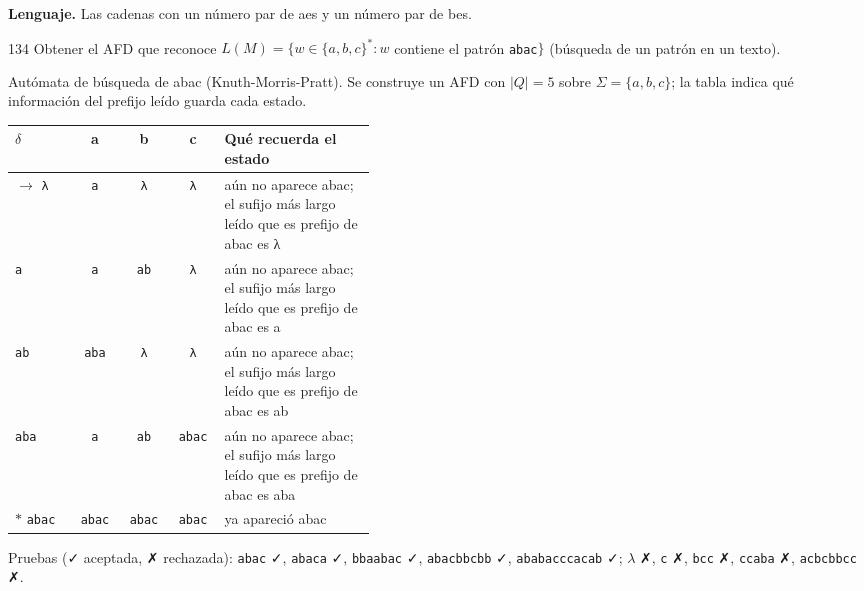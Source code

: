 \documentclass[11pt]{article}
\begin{document}
\textbf{Lenguaje.} Las cadenas con un número par de aes y un número par de bes.



\begin{ejercicio}{134}{}
Obtener el AFD que reconoce $L(M) = \{w \in \{a,b,c\}^* : w$ contiene el patrón \texttt{abac}$\}$ (búsqueda de un patrón en un texto).
\end{ejercicio}
\proc Autómata de búsqueda de abac (Knuth-Morris-Pratt). Se construye un AFD con $|Q| = 5$ sobre $\Sigma = \{a, b, c\}$; la tabla indica qué información del prefijo leído guarda cada estado.
\begin{center}\small\begin{tabular}{lcccp{0.42\linewidth}}\toprule
$\delta$ & a & b & c & Qué recuerda el estado \\\midrule
$\to$ \texttt{λ} & \texttt{a} & \texttt{λ} & \texttt{λ} & aún no aparece abac; el sufijo más largo leído que es prefijo de abac es λ \\
 \texttt{a} & \texttt{a} & \texttt{ab} & \texttt{λ} & aún no aparece abac; el sufijo más largo leído que es prefijo de abac es a \\
 \texttt{ab} & \texttt{aba} & \texttt{λ} & \texttt{λ} & aún no aparece abac; el sufijo más largo leído que es prefijo de abac es ab \\
 \texttt{aba} & \texttt{a} & \texttt{ab} & \texttt{abac} & aún no aparece abac; el sufijo más largo leído que es prefijo de abac es aba \\
$*$ \texttt{abac} & \texttt{abac} & \texttt{abac} & \texttt{abac} & ya apareció abac \\
\bottomrule\end{tabular}\end{center}
Pruebas (✓ aceptada, ✗ rechazada): \texttt{abac} ✓, \texttt{abaca} ✓, \texttt{bbaabac} ✓, \texttt{abacbbcbb} ✓, \texttt{ababacccacab} ✓; $\lambda$ ✗, \texttt{c} ✗, \texttt{bcc} ✗, \texttt{ccaba} ✗, \texttt{acbcbbcc} ✗.
\end{document}
